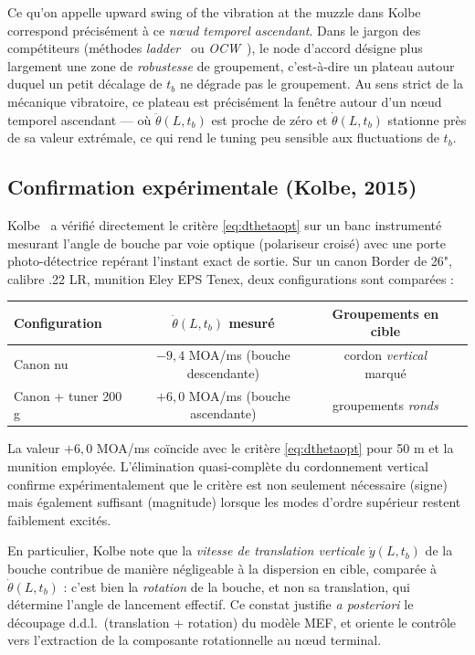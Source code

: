 \documentclass[12pt,a4paper]{article}
\begin{document}
	Ce qu'on appelle \og upward swing of the vibration at the muzzle \fg{} dans Kolbe~\cite{Kolbe,KolbeWeb} correspond précisément à ce \emph{nœud temporel ascendant}. Dans le jargon des compétiteurs (méthodes \emph{ladder}~\cite{Audette} ou \emph{OCW}~\cite{Newberry}), le \og node \fg{} d'accord désigne plus largement une zone de \emph{robustesse} de groupement, c'est-à-dire un plateau autour duquel un petit décalage de $t_b$ ne dégrade pas le groupement. Au sens strict de la mécanique vibratoire, ce plateau est précisément la fenêtre autour d'un nœud temporel ascendant — où $\ddot\theta(L,t_b)$ est proche de zéro et $\dot\theta(L,t_b)$ stationne près de sa valeur extrémale, ce qui rend le tuning peu sensible aux fluctuations de $t_b$.

	\subsection{Confirmation expérimentale (Kolbe, 2015)}

	Kolbe~\cite{KolbeWeb} a vérifié directement le critère \eqref{eq:dthetaopt} sur un banc instrumenté mesurant l'angle de bouche par voie optique (polariseur croisé) avec une porte photo-détectrice repérant l'instant exact de sortie. Sur un canon Border de 26", calibre .22 LR, munition Eley EPS Tenex, deux configurations sont comparées :
	\begin{center}
	\begin{tabular}{lccc}
		\toprule
		Configuration & $\dot\theta(L,t_b)$ mesuré & Groupements en cible \\
		\midrule
		Canon nu & $-9{,}4$ MOA/ms (bouche descendante) & cordon \emph{vertical} marqué \\
		Canon + tuner 200 g & $+6{,}0$ MOA/ms (bouche ascendante) & groupements \emph{ronds} \\
		\bottomrule
	\end{tabular}
	\end{center}
	La valeur $+6{,}0$ MOA/ms coïncide avec le critère \eqref{eq:dthetaopt} pour 50 m et la munition employée. L'élimination quasi-complète du cordonnement vertical confirme expérimentalement que le critère est non seulement nécessaire (signe) mais également suffisant (magnitude) lorsque les modes d'ordre supérieur restent faiblement excités.

	En particulier, Kolbe note que la \emph{vitesse de translation verticale} $\dot y(L,t_b)$ de la bouche contribue de manière négligeable à la dispersion en cible, comparée à $\dot\theta(L,t_b)$ : c'est bien la \emph{rotation} de la bouche, et non sa translation, qui détermine l'angle de lancement effectif. Ce constat justifie \emph{a posteriori} le découpage d.d.l.\ (translation + rotation) du modèle MEF, et oriente le contrôle vers l'extraction de la composante rotationnelle au n\oe ud terminal.
\end{document}
